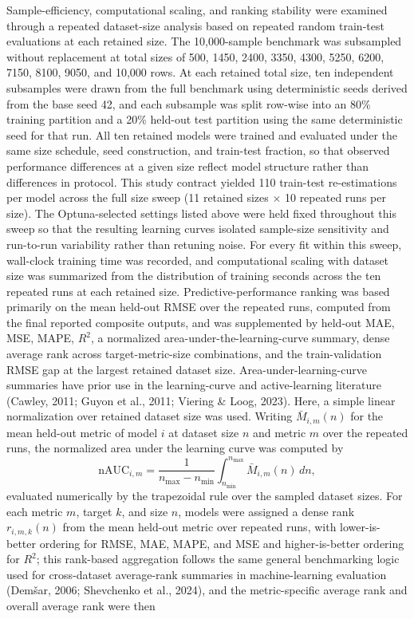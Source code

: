 \documentclass[a4paper,fleqn]{cas-sc}
\newenvironment{revblock}{}{}
\newenvironment{revblockr25}{}{}
\begin{document}
\begin{revblock}
\begin{revblockr25}
Sample-efficiency, computational scaling, and ranking stability were examined through a repeated dataset-size analysis based on repeated random train-test evaluations at each retained size. The 10,000-sample benchmark was subsampled without replacement at total sizes of 500, 1450, 2400, 3350, 4300, 5250, 6200, 7150, 8100, 9050, and 10,000 rows. At each retained total size, ten independent subsamples were drawn from the full benchmark using deterministic seeds derived from the base seed 42, and each subsample was split row-wise into an 80\% training partition and a 20\% held-out test partition using the same deterministic seed for that run. All ten retained models were trained and evaluated under the same size schedule, seed construction, and train-test fraction, so that observed performance differences at a given size reflect model structure rather than differences in protocol. This study contract yielded 110 train-test re-estimations per model across the full size sweep (11 retained sizes $\times$ 10 repeated runs per size). The Optuna-selected settings listed above were held fixed throughout this sweep so that the resulting learning curves isolated sample-size sensitivity and run-to-run variability rather than retuning noise. For every fit within this sweep, wall-clock training time was recorded, and computational scaling with dataset size was summarized from the distribution of training seconds across the ten repeated runs at each retained size. Predictive-performance ranking was based primarily on the mean held-out RMSE over the repeated runs, computed from the final reported composite outputs, and was supplemented by held-out MAE, MSE, MAPE, $R^2$, a normalized area-under-the-learning-curve summary, dense average rank across target-metric-size combinations, and the train-validation RMSE gap at the largest retained dataset size. Area-under-learning-curve summaries have prior use in the learning-curve and active-learning literature (Cawley, 2011; Guyon et al., 2011; Viering \& Loog, 2023). Here, a simple linear normalization over retained dataset size was used. Writing $\bar{M}_{i,m}(n)$ for the mean held-out metric of model $i$ at dataset size $n$ and metric $m$ over the repeated runs, the normalized area under the learning curve was computed by
\begin{equation}
\mathrm{nAUC}_{i,m} = \frac{1}{n_{\max} - n_{\min}} \int_{n_{\min}}^{n_{\max}} \bar{M}_{i,m}(n)\,dn,
\end{equation}
evaluated numerically by the trapezoidal rule over the sampled dataset sizes. For each metric $m$, target $k$, and size $n$, models were assigned a dense rank $r_{i,m,k}(n)$ from the mean held-out metric over repeated runs, with lower-is-better ordering for RMSE, MAE, MAPE, and MSE and higher-is-better ordering for $R^2$; this rank-based aggregation follows the same general benchmarking logic used for cross-dataset average-rank summaries in machine-learning evaluation (Dem\v{s}ar, 2006; Shevchenko et al., 2024), and the metric-specific average rank and overall average rank were then

\end{revblockr25}
\end{revblock}
\end{document}
